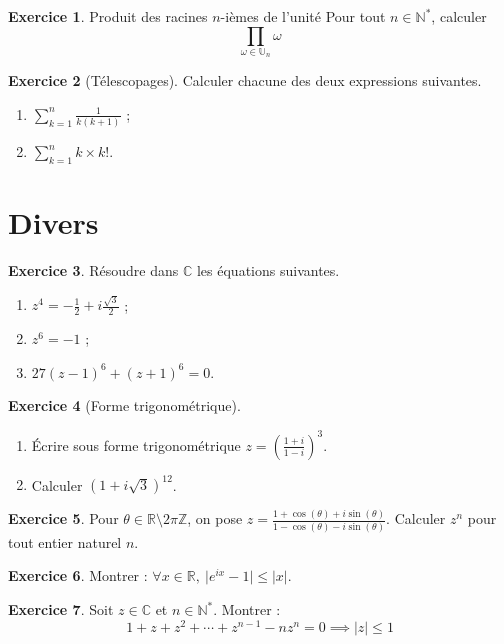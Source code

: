 \documentclass[french]{book}
\newcommand{\N}{\mathbb{N}}
\newcommand{\Z}{\mathbb{Z}}
\newcommand{\R}{\mathbb{R}}
\newcommand{\C}{\mathbb{C}}
\newcommand{\U}{\mathbb{U}}
\newcommand{\st}{^*}
\theoremstyle{definition}
\newtheorem{ex}{Exercice}[chapter]
\theoremstyle{theorem}
\theoremstyle{remark}
\begin{document}
\begin{ex}{Produit des racines $n$-ièmes de l'unité}
	Pour tout $n \in \N\st$, calculer $$\prod_{\omega \in \U_n}\omega$$
\end{ex}

\begin{ex}[Télescopages]
	Calculer chacune des deux expressions suivantes.
	\begin{enumerate}
		\item $\displaystyle\sum_{k=1}^{n}\frac{1}{k(k+1)}$ ;
		\item $\displaystyle\sum_{k=1}^{n}k\times k!$.
	\end{enumerate}
\end{ex}

\section{Divers}

\begin{ex}
	Résoudre dans $\C$ les équations suivantes.
	\begin{enumerate}
		\item $\displaystyle z^4=-\frac{1}{2}+i\frac{\sqrt{3}}{2}$ ;
		\item $z^6=-1$ ;
		\item $27(z-1)^6+(z+1)^6=0$.
	\end{enumerate}
\end{ex}

\begin{ex}[Forme trigonométrique]
	\begin{enumerate}
		\item Écrire sous forme trigonométrique $z=\displaystyle\left(\frac{1+i}{1-i}\right)^3$.
		\item Calculer $(1+i\sqrt{3})^{12}$.
	\end{enumerate}
\end{ex}

\begin{ex}
	Pour $\theta\in\R\setminus2\pi\Z$, on pose $z=\frac{1+\cos(\theta)+i\sin(\theta)}{1-\cos(\theta)-i\sin(\theta)}$. Calculer $z^n$ pour tout entier naturel $n$.
\end{ex}

\begin{ex}
	Montrer : $\forall x\in\R,\ \lvert e^{ix}-1\rvert\leqslant \lvert x\rvert$.
\end{ex}

\begin{ex}
	Soit $z\in\C$ et $n\in\N\st$. Montrer : $$1+z+z^2+\cdots+z^{n-1}-nz^n=0\implies\lvert z\rvert\leqslant 1$$
\end{ex}
\end{document}
